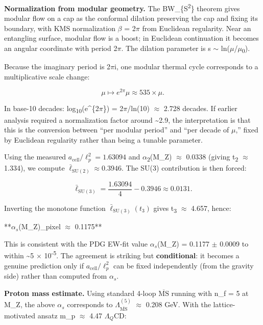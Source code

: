 \documentclass[11pt,a4paper]{article}
\theoremstyle{remark}
\begin{document}
\textbf{Normalization from modular geometry.} The BW\_\{S\textsuperscript{2}\} theorem gives modular flow on a cap as the conformal dilation preserving the cap and fixing its boundary, with KMS normalization \ensuremath{\beta} = 2\ensuremath{\pi} from Euclidean regularity. Near an entangling surface, modular flow is a boost; in Euclidean continuation it becomes an angular coordinate with period 2\ensuremath{\pi}. The dilation parameter is s \ensuremath{\sim} ln(\ensuremath{\mu}/\ensuremath{\mu}\textsubscript{0}).

Because the imaginary period is 2\ensuremath{\pi}i, one modular thermal cycle corresponds to a multiplicative scale change:

\[
\mu \mapsto e^{2\pi} \mu \approx 535 \times \mu.
\]

In base-10 decades: log\textsubscript{10}(e\^{}\{2\ensuremath{\pi}\}) = 2\ensuremath{\pi}/ln(10) \ensuremath{\approx} 2.728 decades. If earlier analysis required a normalization factor around \textasciitilde2.9, the interpretation is that this is the conversion between ``per modular period'' and ``per decade of \ensuremath{\mu},'' fixed by Euclidean regularity rather than being a tunable parameter.

Using the measured \(a_{\mathrm{cell}}/\ell_p^2 = 1.63094\) and \ensuremath{\alpha}\textsubscript{2}(M\_Z) \ensuremath{\approx} 0.0338
(giving t\textsubscript{2} \ensuremath{\approx} 1.334), we compute \(\bar{\ell}_{\mathrm{SU}(2)} \approx 0.3946\). The
SU(3) contribution is then forced:

\[
\bar{\ell}_{\mathrm{SU}(3)} = \frac{1.63094}{4} - 0.3946 \approx 0.0131.
\]

Inverting the monotone function \(\bar{\ell}_{\mathrm{SU}(3)}(t_3)\) gives
t\textsubscript{3} \ensuremath{\approx} 4.657, hence:

**\(\alpha_s\)(M\_Z)\textbar\_pixel \ensuremath{\approx} 0.1175**

This is consistent with the PDG EW-fit value \(\alpha_s\)(M\_Z) = 0.1177 \ensuremath{\pm} 0.0009 to within
\textasciitilde5 \ensuremath{\times} 10\textsuperscript{-5}. The agreement is striking but \textbf{conditional}: it becomes a
genuine prediction only if \(a_{\mathrm{cell}}/\ell_p^2\) can be fixed
independently (from the gravity side) rather than computed from \(\alpha_s\).

\textbf{Proton mass estimate.} Using standard 4-loop \(\overline{\mathrm{MS}}\) running
with n\_f = 5 at M\_Z, the above \(\alpha_s\) corresponds to
\(\Lambda_{\overline{\mathrm{MS}}}^{(5)}\) \ensuremath{\approx} 0.208 GeV. With the lattice-motivated ansatz
m\_p \ensuremath{\approx} 4.47 \(\Lambda{}_Q\)CD:
\end{document}
